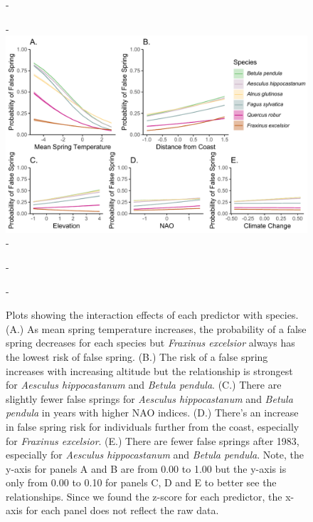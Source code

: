 \documentclass{article}\usepackage[]{graphicx}\usepackage[]{color}
\begin{document}
{\begin{figure} [H]
  -\begin{center}
  -\includegraphics[width=16cm]{..//figures/InteractionPlots/Species_orig.pdf}
  -\caption{Plots showing the interaction effects of each predictor with species. (A.) As mean spring temperature increases, the probability of a false spring decreases for each species but \textit{Fraxinus excelsior} always has the lowest risk of false spring. (B.) The risk of a false spring increases with increasing altitude but the relationship is strongest for \textit{Aesculus hippocastanum} and \textit{Betula pendula}. (C.) There are slightly fewer false springs for \textit{Aesculus hippocastanum} and \textit{Betula pendula} in years with higher NAO indices. (D.) There's an increase in false spring risk for individuals further from the coast, especially for \textit{Fraxinus excelsior}. (E.) There are fewer false springs after 1983, especially for \textit{Aesculus hippocastanum} and \textit{Betula pendula}. Note, the y-axis for panels A and B are from 0.00 to 1.00 but the y-axis is only from 0.00 to 0.10 for panels C, D and E to better see the relationships. Since we found the z-score for each predictor, the x-axis for each panel does not reflect the raw data.}\label{fig:spp}
  -\end{center}
  -\end{figure}}


  
\end{document}
